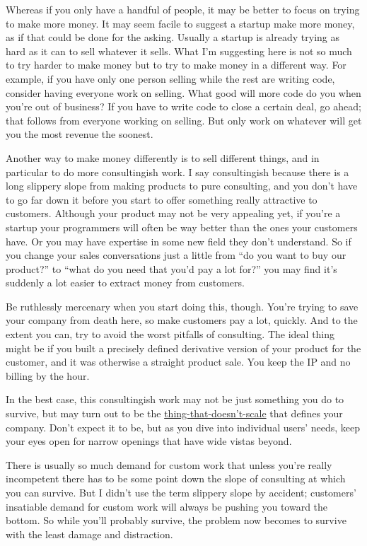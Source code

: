 Whereas if you only have a handful of people, it may be better to focus
on trying to make more money. It may seem facile to suggest a startup
make more money, as if that could be done for the asking. Usually a
startup is already trying as hard as it can to sell whatever it sells.
What I'm suggesting here is not so much to try harder to make money but
to try to make money in a different way. For example, if you have only
one person selling while the rest are writing code, consider having
everyone work on selling. What good will more code do you when you're
out of business? If you have to write code to close a certain deal, go
ahead; that follows from everyone working on selling. But only work on
whatever will get you the most revenue the soonest.

Another way to make money differently is to sell different things, and
in particular to do more consultingish work. I say consultingish because
there is a long slippery slope from making products to pure consulting,
and you don't have to go far down it before you start to offer something
really attractive to customers. Although your product may not be very
appealing yet, if you're a startup your programmers will often be way
better than the ones your customers have. Or you may have expertise in
some new field they don't understand. So if you change your sales
conversations just a little from ``do you want to buy our product?'' to
``what do you need that you'd pay a lot for?'' you may find it's
suddenly a lot easier to extract money from customers.

Be ruthlessly mercenary when you start doing this, though. You're trying
to save your company from death here, so make customers pay a lot,
quickly. And to the extent you can, try to avoid the worst pitfalls of
consulting. The ideal thing might be if you built a precisely defined
derivative version of your product for the customer, and it was
otherwise a straight product sale. You keep the IP and no billing by the
hour.

In the best case, this consultingish work may not be just something you
do to survive, but may turn out to be the
\href{ds.html}{thing-that-doesn't-scale} that defines your company.
Don't expect it to be, but as you dive into individual users' needs,
keep your eyes open for narrow openings that have wide vistas beyond.

There is usually so much demand for custom work that unless you're
really incompetent there has to be some point down the slope of
consulting at which you can survive. But I didn't use the term slippery
slope by accident; customers' insatiable demand for custom work will
always be pushing you toward the bottom. So while you'll probably
survive, the problem now becomes to survive with the least damage and
distraction.


